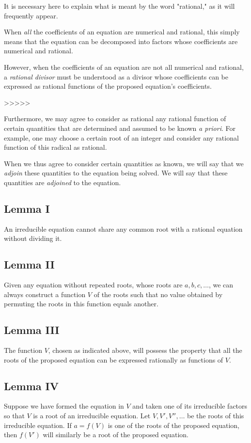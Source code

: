 \documentclass{article}
\begin{document}
It is necessary here to explain what is meant by the word "rational," as it will frequently appear.

When \textit{all} the coefficients of an equation are numerical and rational, this simply means that the equation can be decomposed into factors whose coefficients are numerical and rational.

However, when the coefficients of an equation are not all numerical and rational, a \textit{rational divisor} must be understood as a divisor whose coefficients can be expressed as rational functions of the proposed equation's coefficients.

>>>>>

Furthermore, we may agree to consider as rational any rational function of certain quantities that are determined and assumed to be known \textit{a priori}. For example, one may choose a certain root of an integer and consider any rational function of this radical as rational.

When we thus agree to consider certain quantities as known, we will say that we \textit{adjoin} these quantities to the equation being solved. We will say that these quantities are \textit{adjoined} to the equation.

\subsection*{Lemma I}
An irreducible equation cannot share any common root with a rational equation without dividing it.

\subsection*{Lemma II}
Given any equation without repeated roots, whose roots are $a, b, c, \ldots$, we can always construct a function $V$ of the roots such that no value obtained by permuting the roots in this function equals another.

\subsection*{Lemma III}
The function $V$, chosen as indicated above, will possess the property that all the roots of the proposed equation can be expressed rationally as functions of $V$.

\subsection*{Lemma IV}
Suppose we have formed the equation in $V$ and taken one of its irreducible factors so that $V$ is a root of an irreducible equation. Let $V, V', V'', \ldots$ be the roots of this irreducible equation. If $a = f(V)$ is one of the roots of the proposed equation, then $f(V')$ will similarly be a root of the proposed equation.
\end{document}
